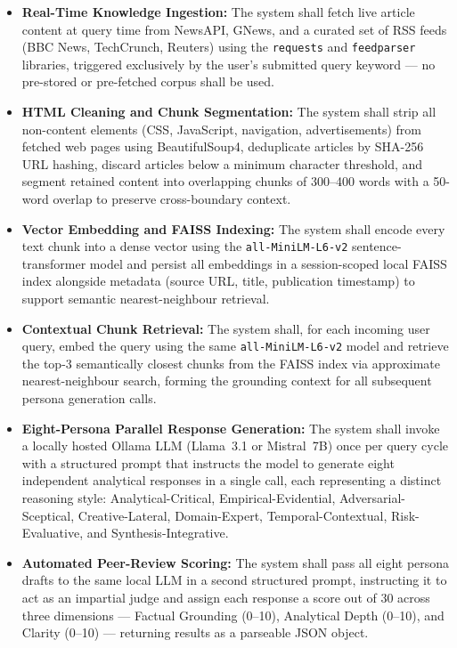 \begin{itemize}

    \item \textbf{Real-Time Knowledge Ingestion:}
    The system shall fetch live article content at query time from NewsAPI, GNews,
    and a curated set of RSS feeds (BBC News, TechCrunch, Reuters) using the
    \texttt{requests} and \texttt{feedparser} libraries, triggered exclusively by
    the user's submitted query keyword — no pre-stored or pre-fetched corpus shall
    be used.

    \item \textbf{HTML Cleaning and Chunk Segmentation:}
    The system shall strip all non-content elements (CSS, JavaScript, navigation,
    advertisements) from fetched web pages using BeautifulSoup4, deduplicate articles
    by SHA-256 URL hashing, discard articles below a minimum character threshold,
    and segment retained content into overlapping chunks of 300--400 words with a
    50-word overlap to preserve cross-boundary context.

    \item \textbf{Vector Embedding and FAISS Indexing:}
    The system shall encode every text chunk into a dense vector using the
    \texttt{all-MiniLM-L6-v2} sentence-transformer model and persist all embeddings
    in a session-scoped local FAISS index alongside metadata (source URL, title,
    publication timestamp) to support semantic nearest-neighbour retrieval.

    \item \textbf{Contextual Chunk Retrieval:}
    The system shall, for each incoming user query, embed the query using the same
    \texttt{all-MiniLM-L6-v2} model and retrieve the top-3 semantically closest
    chunks from the FAISS index via approximate nearest-neighbour search, forming
    the grounding context for all subsequent persona generation calls.

    \item \textbf{Eight-Persona Parallel Response Generation:}
    The system shall invoke a locally hosted Ollama LLM (Llama~3.1 or Mistral~7B)
    once per query cycle with a structured prompt that instructs the model to
    generate eight independent analytical responses in a single call, each
    representing a distinct reasoning style: Analytical-Critical, Empirical-Evidential,
    Adversarial-Sceptical, Creative-Lateral, Domain-Expert, Temporal-Contextual,
    Risk-Evaluative, and Synthesis-Integrative.

    \item \textbf{Automated Peer-Review Scoring:}
    The system shall pass all eight persona drafts to the same local LLM in a
    second structured prompt, instructing it to act as an impartial judge and assign
    each response a score out of 30 across three dimensions — Factual Grounding (0--10),
    Analytical Depth (0--10), and Clarity (0--10) — returning results as a
    parseable JSON object.


\end{itemize}
